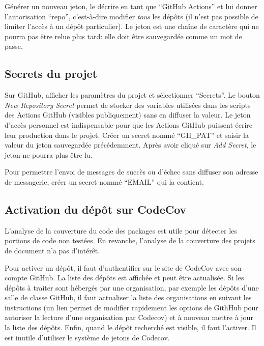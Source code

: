 \documentclass[
  11pt,
  french,
  a4paper,
  extrafontsizes,onecolumn,openright
  ]{memoir}
\begin{document}
Générer un nouveau jeton, le décrire en tant que ``GitHub Actions'' et lui donner l'autorisation ``repo'', c'est-à-dire modifier \emph{tous} les dépôts (il n'est pas possible de limiter l'accès à un dépôt particulier).
Le jeton est une chaîne de caractère qui ne pourra pas être relue plus tard: elle doit être sauvegardée comme un mot de passe.

\hypertarget{sec:secrets-ci}{%
\subsection{Secrets du projet}\label{sec:secrets-ci}}

Sur GitHub, afficher les paramètres du projet et sélectionner ``Secrets''.
Le bouton \emph{New Repository Secret} permet de stocker des variables utilisées dans les scripts des Actions GitHub (visibles publiquement) sans en diffuser la valeur.
Le jeton d'accès personnel est indispensable pour que les Actions GitHub puissent écrire leur production dans le projet.
Créer un secret nommé ``GH\_PAT'' et saisir la valeur du jeton sauvegardée précédemment.
Après avoir cliqué sur \emph{Add Secret}, le jeton ne pourra plus être lu.

Pour permettre l'envoi de messages de succès ou d'échec sans diffuser son adresse de messagerie, créer un secret nommé ``EMAIL'' qui la contient.

\hypertarget{activation-du-duxe9puxf4t-sur-codecov}{%
\subsection{Activation du dépôt sur CodeCov}\label{activation-du-duxe9puxf4t-sur-codecov}}

L'analyse de la couverture du code des packages est utile pour détecter les portions de code non testées.
En revanche, l'analyse de la couverture des projets de document n'a pas d'intérêt.

Pour activer un dépôt, il faut d'authentifier sur le site de CodeCov avec son compte GitHub.
La liste des dépôts est affichée et peut être actualisée.
Si les dépôts à traiter sont hébergés par une organisation, par exemple les dépôts d'une salle de classe GitHub, il faut actualiser la liste des organisations en suivant les instructions (un lien permet de modifier rapidement les options de GithHub pour autoriser la lecture d'une organisation par Codecov) et à nouveau mettre à jour la liste des dépôts.
Enfin, quand le dépôt recherché est visible, il faut l'activer.
Il est inutile d'utiliser le système de jetons de Codecov.
\end{document}
